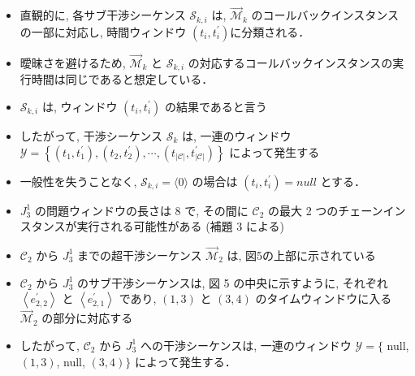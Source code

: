 \begin{frame}{}
    \begin{itemize}
        \item 直観的に, 各サブ干渉シーケンス $\mathcal{S}_{k, i}$ は, $\overrightarrow{\mathcal{M}}_{k}$ のコールバックインスタンスの一部に対応し, 時間ウィンドウ $\left(t_{i}, t_{i}^{\prime}\right)$に分類される．
        \item 曖昧さを避けるため, $\overrightarrow{\mathcal{M}}_{k}$ と $\mathcal{S}_{k, i}$ の対応するコールバックインスタンスの実行時間は同じであると想定している．
    \end{itemize}
\end{frame}

\begin{frame}{}
    \begin{itemize}
        \item $\mathcal{S}_{k, i}$ は, ウィンドウ $\left(t_{i}, t_{i}^{\prime}\right)$ の結果であると言う
        \item したがって, 干渉シーケンス $\mathcal{S}_{k}$ は, 一連のウィンドウ $\mathcal{Y}=\left\{\left(t_{1}, t_{1}^{\prime}\right),\left(t_{2}, t_{2}^{\prime}\right), \cdots,\left(t_{|\mathcal{C}|}, t_{|\mathcal{C}|}^{\prime}\right)\right\}$ によって発生する
        \item 一般性を失うことなく, $\mathcal{S}_{k, i}=\langle 0\rangle$ の場合は $\left(t_{i}, t_{i}^{\prime}\right)=n u l l$ とする．
    \end{itemize}
\end{frame}

\begin{frame}{}
\end{frame}

\begin{frame}{}
    \begin{itemize}
        \item $J_{3}^{1}$ の問題ウィンドウの長さは 8 で, その間に $\mathcal{C}_{2}$ の最大 2 つのチェーンインスタンスが実行される可能性がある (補題 3 による)
        \item $\mathcal{C}_{2}$ から $J_{3}^{1}$ までの超干渉シーケンス $\overrightarrow{\mathcal{M}}_{2}$ は, 図5の上部に示されている
        \item $\mathcal{C}_{2}$ から $J_{3}^{1}$ のサブ干渉シーケンスは, 図 5 の中央に示すように, それぞれ $\left\langle e_{2,2}^{\prime}\right\rangle$ と $\left\langle e_{2,1}^{\prime}\right\rangle$ であり, $(1,3)$ と $(3,4)$ のタイムウィンドウに入る $\overrightarrow{\mathcal{M}}_{2}$ の部分に対応する
        \item したがって, $\mathcal{C}_{2}$ から $J_{3}^{1}$ への干渉シーケンスは, 一連のウィンドウ $\mathcal{Y}=\{$ null, $(1,3)$, null, $(3,4)\}$ によって発生する．
    \end{itemize}
\end{frame}

